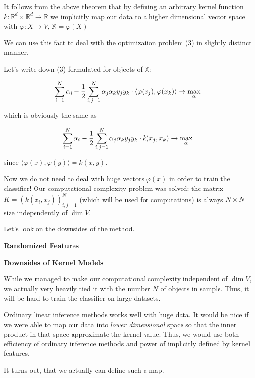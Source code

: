 \documentclass{article}
\theoremstyle{bfnote}
\begin{document}
	It follows from the above theorem that by defining an arbitrary kernel function
	$k:\mathbb{R}^d \times \mathbb{R}^d \rightarrow \mathbb{R}$ 
	we implicitly map our data to a higher dimensional vector space with $\varphi: X \rightarrow V$, $\mathbb{X} = \varphi(X)$
	
	
	We can use this fact to deal with the optimization problem (3) in slightly distinct manner.
	
	Let's write down (3) formulated for objects of $\mathbb{X}$:
	
	$$
	\sum_{i=1}^N {\alpha_i} - \frac{1}{2}\sum_{i,j=1}^N \alpha_j \alpha_k y_j y_k \cdot \langle \varphi(x_j), \varphi(x_k) \rangle
	\rightarrow \max\limits_{\alpha} \\
	$$
	
	which is obviously the same as
	
	$$
		\sum_{i=1}^N {\alpha_i} - \frac{1}{2}\sum_{i,j=1}^N \alpha_j \alpha_k y_j y_k 
	\cdot k(x_j, x_k)
	\rightarrow \max\limits_{\alpha} \\
	$$
	
	since $\langle \varphi(x), \varphi(y) \rangle = k(x, y)$.
	
	Now we do not need to deal with huge vectors $\varphi(x)$ in order to train the classifier! Our computational complexity problem was solved: the matrix $K=(k(x_i, x_j))_{i, j=1}^N$ (which will be used for computations) is always $N \times N$ size independently of $\dim V$.
	
	Let's look on the downsides of the method.
	
	\newpage
	
	\begin{center}
		\textbf{\large Randomized Features}
	\end{center}
	
	\textbf{Downsides of Kernel Models}
	
	While we managed to make our computational complexity independent of $\dim V$, we actually very heavily tied it with the number $N$ of objects in sample. Thus, it will be hard to train the classifier on large datasets.
	
	Ordinary linear inference methods works well with huge data. It would be nice if we were able to map our data into \textit{lower dimensional} space so that the inner product in that space approximate the kernel value. Thus, we would use both efficiency of ordinary inference methods and power of implicitly defined by kernel features.
	
	It turns out, that we actually can define such a map.
	
\end{document}
